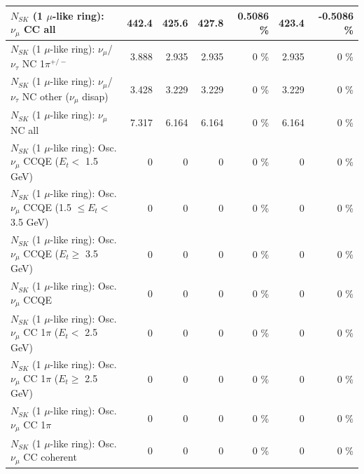 \begin{table}
\begin{tabular}{| l | r | r | r  r | r  r |}
                                $N_{SK}$ (1 $\mu$-like ring): $\nu_{\mu}$ CC all &           442.4 &           425.6 &           427.8 &   0.5086 \%  &           423.4 &  -0.5086 \%  \\ 
\hline
              $N_{SK}$ (1 $\mu$-like ring): $\nu_\mu$/$\nu_\tau$ NC 1$\pi^{+/-}$ &           3.888 &           2.935 &           2.935 &        0 \%  &           2.935 &        0 \%  \\ 
   $N_{SK}$ (1 $\mu$-like ring): $\nu_\mu$/$\nu_\tau$ NC other ($\nu_\mu$ disap) &           3.428 &           3.229 &           3.229 &        0 \%  &           3.229 &        0 \%  \\ 
                                $N_{SK}$ (1 $\mu$-like ring): $\nu_{\mu}$ NC all &           7.317 &           6.164 &           6.164 &        0 \%  &           6.164 &        0 \%  \\ 
\hline
\hline
           $N_{SK}$ (1 $\mu$-like ring): Osc. $\nu_\mu$ CCQE ($E_{t} <$ 1.5 GeV) &               0 &               0 &               0 &        0 \%  &               0 &        0 \%  \\ 
  $N_{SK}$ (1 $\mu$-like ring): Osc. $\nu_\mu$ CCQE (1.5 $\leq E_{t} <$ 3.5 GeV) &               0 &               0 &               0 &        0 \%  &               0 &        0 \%  \\ 
        $N_{SK}$ (1 $\mu$-like ring): Osc. $\nu_\mu$ CCQE ($E_{t} \geq$ 3.5 GeV) &               0 &               0 &               0 &        0 \%  &               0 &        0 \%  \\ 
\hline
                               $N_{SK}$ (1 $\mu$-like ring): Osc. $\nu_\mu$ CCQE &               0 &               0 &               0 &        0 \%  &               0 &        0 \%  \\ 
\hline
      $N_{SK}$ (1 $\mu$-like ring): Osc. $\nu_\mu$ CC 1$\pi$ ($E_{t} <$ 2.5 GeV) &               0 &               0 &               0 &        0 \%  &               0 &        0 \%  \\ 
   $N_{SK}$ (1 $\mu$-like ring): Osc. $\nu_\mu$ CC 1$\pi$ ($E_{t} \geq$ 2.5 GeV) &               0 &               0 &               0 &        0 \%  &               0 &        0 \%  \\ 
\hline
                          $N_{SK}$ (1 $\mu$-like ring): Osc. $\nu_\mu$ CC 1$\pi$ &               0 &               0 &               0 &        0 \%  &               0 &        0 \%  \\ 
                        $N_{SK}$ (1 $\mu$-like ring): Osc. $\nu_\mu$ CC coherent &               0 &               0 &               0 &        0 \%  &               0 &        0 \%  \\ 

\end{tabular}
\end{table}
